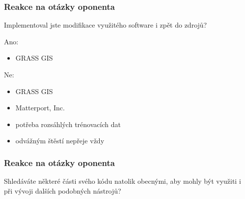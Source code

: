 \documentclass{beamer}
\begin{document}
\begin{frame}

\frametitle{Reakce na otázky oponenta}

Implementoval jste modifikace využitého software i zpět do zdrojů?

\begin{center}
	\noindent\makebox[\linewidth]{\rule{0.9\textwidth}{0.4pt}}
\end{center}

\bigskip

Ano:
\begin{itemize}
	\item<2-> GRASS GIS
\end{itemize}

Ne:
\begin{itemize}
	\item<3-> GRASS GIS
	\item<4-> Matterport, Inc.
	\item<7-> potřeba rozsáhlých trénovacích dat
	\item<8-> odvážným štěstí nepřeje vždy
\end{itemize}

\end{frame}


\begin{frame}

\frametitle{Reakce na otázky oponenta}

Shledáváte některé části svého kódu natolik obecnými, aby mohly být využiti i při vývoji dalších podobných nástrojů?

\begin{center}
	\noindent\makebox[\linewidth]{\rule{0.9\textwidth}{0.4pt}}
\end{center}

\bigskip


\end{frame}

\end{document}
